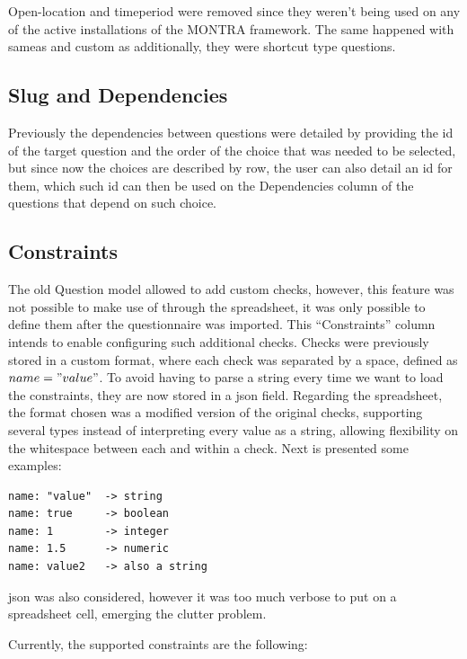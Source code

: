 Open-location and timeperiod were removed since they weren't being used on any of the active installations of the MONTRA framework.
The same happened with sameas and custom as additionally, they were shortcut type questions.

\subsection*{Slug and Dependencies}

Previously the dependencies between questions were detailed by providing the id of the target question and the order of the choice that was needed to be selected, but since now the choices are described by row, the user can also detail an id for them, which such id can then be used on the Dependencies column of the questions that depend on such choice.

\subsection*{Constraints}

The old Question model allowed to add custom checks, however, this feature was not possible to make use of through the spreadsheet, it was only possible to define them after the questionnaire was imported.
This ``Constraints'' column intends to enable configuring such additional checks.
Checks were previously stored in a custom format, where each check was separated by a space, defined as $name="value"$.
To avoid having to parse a string every time we want to load the constraints, they are now stored in a \gls{json} field.
Regarding the spreadsheet, the format chosen was a modified version of the original checks, supporting several types instead of interpreting every value as a string, allowing flexibility on the whitespace between each and within a check.
Next is presented some examples:

\begin{verbatim}
name: "value"  -> string
name: true     -> boolean
name: 1        -> integer
name: 1.5      -> numeric
name: value2   -> also a string
\end{verbatim}

\gls{json} was also considered, however it was too much verbose to put on a spreadsheet cell, emerging the clutter problem.

Currently, the supported constraints are the following:

